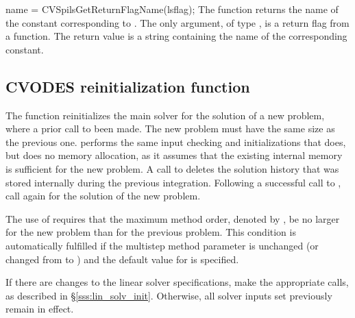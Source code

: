 {
  name = CVSpilsGetReturnFlagName(lsflag);
}
{
  The function  returns the
  name of the {\cvspils} constant corresponding to .
}
{
  The only argument, of type , is a return flag from a {\cvspils} function.
}
{
  The return value is a string containing the name of the corresponding constant.
}
{}


\subsection{CVODES reinitialization function}\label{sss:cvreinit}

The function  reinitializes the main {\cvodes} solver for
the solution of a new problem, where a prior call to 
been made. The new problem must have the same size as the previous one.
 performs the same input checking and initializations 
that  does, but does no memory allocation, as it assumes that the 
existing internal memory is sufficient for the new problem.
A call to  deletes the solution history that was stored
internally during the previous integration.  Following a successful call to
, call  again for the solution of the new problem.

The use of  requires that the maximum method order, denoted by 
, be no larger for the new problem than for the previous problem.
This condition is  automatically fulfilled if the multistep method parameter
 is unchanged (or changed from  to ) and the
default value for  is specified.

If there are changes to the linear solver specifications, make the
appropriate  calls, as described in \S\ref{sss:lin_solv_init}.
Otherwise, all solver inputs set previously remain in effect.

